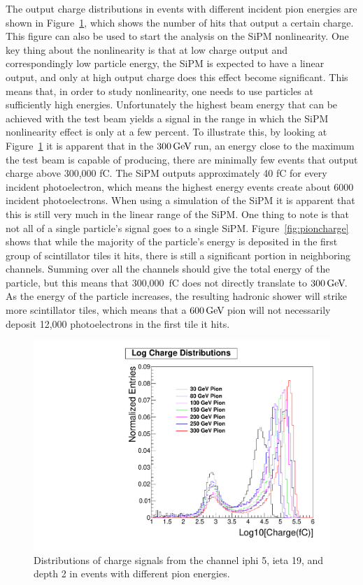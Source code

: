 The output charge distributions in events with different incident pion energies are shown in Figure~\ref{fig:Log}, which shows the number of hits that output a certain charge. This figure can also be used to start the analysis on the SiPM nonlinearity. One key thing about the nonlinearity is that at low charge output and correspondingly low particle energy, the SiPM is expected to have a linear output, and only at high output charge does this effect become significant. This means that, in order to study nonlinearity, one needs to use particles at sufficiently high energies. Unfortunately the highest beam energy that can be achieved with the test beam yields a signal in the range in which the SiPM nonlinearity effect is only at a few percent. To illustrate this, by looking at Figure~\ref{fig:Log} it is apparent that in the $300{\,\text{Ge\hspace{-.08em}V\hspace{-0.16em}}}$ run, an energy close to the maximum the test beam is capable of producing, there are minimally few events that output charge above 300,000 fC. The SiPM outputs approximately 40 fC for every incident photoelectron, which means the highest energy events create about 6000 incident photoelectrons. When using a simulation of the SiPM it is apparent that this is still very much in the linear range of the SiPM. One thing to note is that not all of a single particle's signal goes to a single SiPM. Figure~\ref{fig:pioncharge} shows that while the majority of the particle's energy is deposited in the first group of scintillator tiles it hits, there is still a significant portion in neighboring channels. Summing over all the channels should give the total energy of the particle, but this means that 300,000~fC does not directly translate to $300{\,\text{Ge\hspace{-.08em}V\hspace{-0.16em}}}$. As the energy of the particle increases, the resulting hadronic shower will strike more scintillator tiles, which means that a $600{\,\text{Ge\hspace{-.08em}V\hspace{-0.16em}}}$ pion will not necessarily deposit 12,000 photoelectrons in the first tile it hits.

\begin{figure}
\centering
\includegraphics[width=0.7\linewidth]{Figures/Logplot.pdf}
\caption{Distributions of charge signals from the channel iphi 5, ieta 19, and depth 2 in events with different pion energies.}
\label{fig:Log}
\end{figure}

